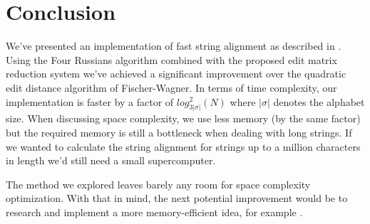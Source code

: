 \documentclass[times, utf8, seminar, numeric]{fer}
\begin{document}

\chapter{Conclusion}
We've presented an implementation of fast string alignment as described in \cite{masek1980faster}. Using the Four Russians algorithm combined with the proposed edit matrix reduction system we've achieved a significant improvement over the quadratic edit distance algorithm of Fischer-Wagner. In terms of time complexity, our implementation is faster by a factor of $log^2_{3|\sigma|}(N)$ where $|\sigma|$ denotes the alphabet size. When discussing space complexity, we use less memory (by the same factor) but the required memory is still a bottleneck when dealing with long strings. If we wanted to calculate the string alignment for strings up to a million characters in length we'd still need a small supercomputer.

The method we explored leaves barely any room for space complexity optimization. With that in mind, the next potential improvement would be to research and implement a more memory-efficient idea, for example \cite{kundeti2008extending}.




\nocite{*}
\end{document}
